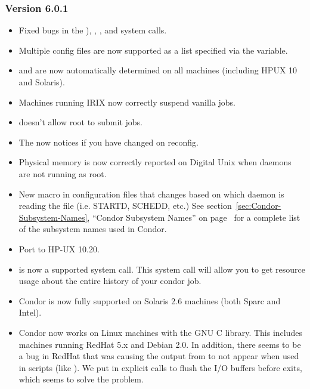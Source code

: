 \subsubsection{\label{sec:New-6-0-1}Version 6.0.1}

\begin{itemize}

\item Fixed bugs in the ), ,
, and  system calls. 

\item Multiple config files are now supported as a list specified via
the  variable. 

\item {} and  are now automatically determined
on all machines (including HPUX 10 and Solaris). 

\item Machines running IRIX now correctly suspend vanilla jobs.

\item {} doesn't allow root to submit jobs.

\item The  now notices if you have changed
 on reconfig.

\item Physical memory is now correctly reported on Digital Unix when
daemons are not running as root. 

\item New  macro in configuration files that changes
based on which daemon is reading the file (i.e. STARTD, SCHEDD, etc.) 
See section~\ref{sec:Condor-Subsystem-Names}, ``Condor Subsystem
Names'' on page~\pageref{sec:Condor-Subsystem-Names} for a complete
list of the subsystem names used in Condor.

\item Port to HP-UX 10.20.  

\item {} is now a supported system call.  
This system call will allow you to get resource usage about the entire
history of your condor job.

\item Condor is now fully supported on Solaris 2.6 machines (both
Sparc and Intel). 

\item Condor now works on Linux machines with the GNU C library.  
This includes machines running RedHat 5.x and Debian 2.0. 
In addition, there seems to be a bug in RedHat that was causing the
output from  to not appear when used in scripts
(like ).
We put in explicit calls to flush the I/O buffers before
 exits, which seems to solve the problem.


\end{itemize}
